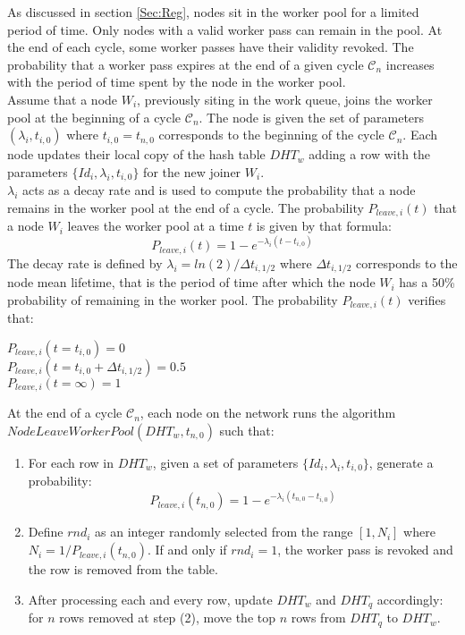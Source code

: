 As discussed in section \ref{Sec:Reg}, nodes sit in the worker pool for a limited period of time. Only nodes with a valid worker pass can remain in the pool. At the end of each cycle, some worker passes have their validity revoked. The probability that a worker pass expires at the end of a given cycle $\mathcal{C}_n$ increases with the period of time spent by the node in the worker pool. \\

Assume that a node $W_i$, previously siting in the work queue, joins the worker pool at the beginning of a cycle $\mathcal{C}_n$. The node is given the set of parameters $(\lambda_i, t_{i,0})$ where $t_{i,0}=t_{n,0}$ corresponds to the beginning of the cycle $\mathcal{C}_n$. Each node updates their local copy of the hash table $DHT_w$ adding a row with the parameters $\{Id_i, \lambda_i, t_{i,0}\}$ for the new joiner $W_i$.\\

$\lambda_i$ acts as a decay rate and is used to compute the probability that a node remains in the worker pool at the end of a cycle. The probability $P_{leave,i}(t)$ that a node $W_i$ leaves the worker pool at a time $t$ is given by that formula:
\begin{equation}
P_{leave,i}(t) = 1 - e^{-\lambda_i(t-t_{i,0})}
\end{equation}
The decay rate is defined by  $\lambda_i = ln(2)/\Delta t_{i,1/2}$ where $\Delta t_{i,1/2}$ corresponds to the node mean lifetime, that is the period of time after which the node $W_i$ has a 50\% probability of remaining in the worker pool. The probability $P_{leave,i}(t)$ verifies that:
\begin{flushleft}
\hspace{6cm}$P_{leave,i}(t = t_{i,0}) = 0$\\
\hspace{6cm}$P_{leave,i}(t = t_{i,0} + \Delta t_{i,1/2}) = 0.5$\\
\hspace{6cm}$P_{leave,i}(t = \infty) = 1$
\end{flushleft}
 
At the end of a cycle $\mathcal{C}_n$, each node on the network runs the algorithm\\ $NodeLeaveWorkerPool(DHT_w,t_{n,0})$ such that:
\begin{enumerate}
\item For each row in $DHT_w$, given a set of parameters $\{Id_i, \lambda_i, t_{i,0}\}$, generate a probability:
\begin{equation}
P_{leave,i}(t_{n,0}) = 1 - e^{-\lambda_i(t_{n,0}-t_{i,0})}
\end{equation}
\item Define $rnd_i$ as an integer randomly selected from the range $[1, N_i]$ where $N_i = 1/P_{leave,i}(t_{n,0})$. If and only if $rnd_i = 1$, the worker pass is revoked and the row is removed from the table.
\item After processing each and every row, update $DHT_w$ and $DHT_q$ accordingly: for $n$ rows removed at step (2), move the top $n$ rows from $DHT_q$ to $DHT_w$. 
\end{enumerate}
